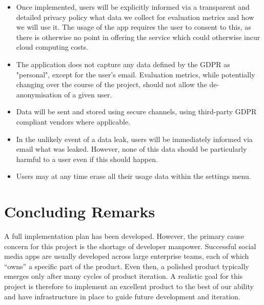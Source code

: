 \begin{itemize}
    \item Once implemented, users will be explicitly informed via a transparent and detailed privacy policy what data we collect for evaluation metrics and how we will use it. The usage of the app requires the user to consent to this, as there is otherwise no point in offering the service which could otherwise incur cloud computing costs.
    \item The application does not capture any data defined by the GDPR as "personal", except for the user's email. Evaluation metrics, while potentially changing over the course of the project, should not allow the de-anonymisation of a given user.
    \item Data will be sent and stored using secure channels, using third-party GDPR compliant vendors where applicable.
    \item In the unlikely event of a data leak, users will be immediately informed via email what was leaked. However, none of this data should be particularly harmful to a user even if this should happen.
    \item Users may at any time erase all their usage data within the settings menu.
\end{itemize}

\section{Concluding Remarks}
A full implementation plan has been developed. However, the primary cause concern for this project is the shortage of developer manpower. Successful social media apps are usually developed across large enterprise teams, each of which ``owns'' a specific part of the product. Even then, a polished product typically emerges only after many cycles of product iteration. A realistic goal for this project is therefore to implement an excellent product to the best of our ability and have infrastructure in place to guide future development and iteration.
